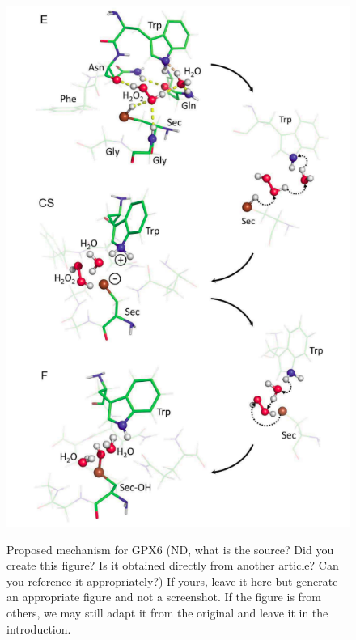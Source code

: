 \documentclass[journal=jacsat,manuscript=article]{achemso}
\begin{document}
\begin{figure}
  \caption{Proposed mechanism for GPX6 (ND, what is the source? Did you create this figure? Is it obtained directly from another article? Can you reference it appropriately?) If yours, leave it here but generate an appropriate figure and not a screenshot. If the figure is from others, we may still adapt it from the original and leave it in the introduction.}
   \label{fgr:example}
   \includegraphics[width=\linewidth]{figures/mechanism.png} 
 \label{fig:mechanism}
 \end{figure}
\end{document}
